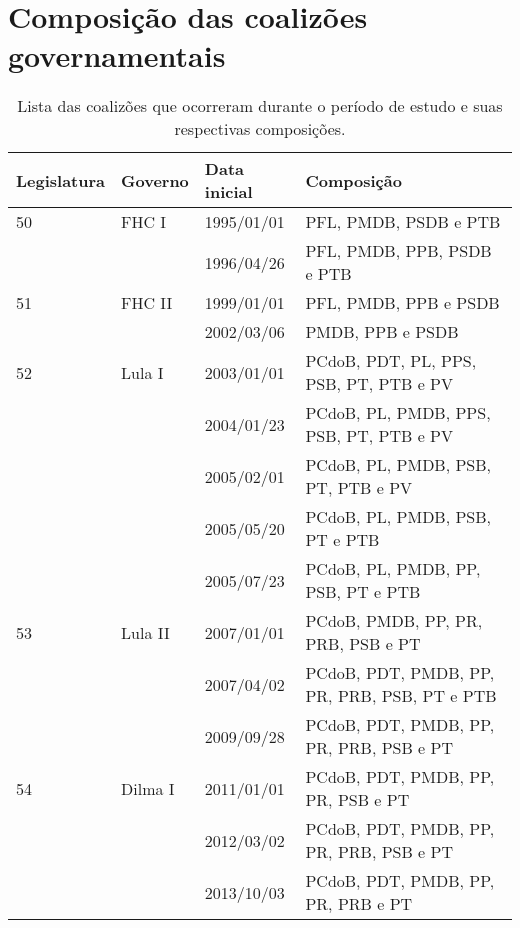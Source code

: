\chapter{Composição das coalizões governamentais}
\label{apendice:composicao-coalizoes}

\begin{longtable}{l l l l}
\caption{Lista das coalizões que ocorreram durante o período de estudo e suas
respectivas composições.} \\
\centering
  Legislatura & Governo & Data inicial & Composição \\
  \hline
  50\textordfeminine{} & FHC I & 1995/01/01 & PFL, PMDB, PSDB e PTB \\
  & & 1996/04/26 & PFL, PMDB, PPB, PSDB e PTB \\
  51\textordfeminine{} & FHC II & 1999/01/01 & PFL, PMDB, PPB e PSDB \\
  & & 2002/03/06 & PMDB, PPB e PSDB \\
  52\textordfeminine{} & Lula I & 2003/01/01 & PCdoB, PDT, PL, PPS, PSB, PT, PTB e PV \\
  & & 2004/01/23 & PCdoB, PL, PMDB, PPS, PSB, PT, PTB e PV \\
  & & 2005/02/01 & PCdoB, PL, PMDB, PSB, PT, PTB e PV \\
  & & 2005/05/20 & PCdoB, PL, PMDB, PSB, PT e PTB \\
  & & 2005/07/23 & PCdoB, PL, PMDB, PP, PSB, PT e PTB \\
  53\textordfeminine{} & Lula II & 2007/01/01 & PCdoB, PMDB, PP, PR, PRB, PSB e PT \\
  & & 2007/04/02 & PCdoB, PDT, PMDB, PP, PR, PRB, PSB, PT e PTB \\
  & & 2009/09/28 & PCdoB, PDT, PMDB, PP, PR, PRB, PSB e PT \\
  54\textordfeminine{} & Dilma I & 2011/01/01 & PCdoB, PDT, PMDB, PP, PR, PSB e PT \\
  & & 2012/03/02 & PCdoB, PDT, PMDB, PP, PR, PRB, PSB e PT \\
  & & 2013/10/03 & PCdoB, PDT, PMDB, PP, PR, PRB e PT \\
\end{longtable}
